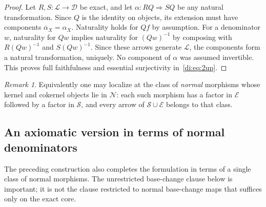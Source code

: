 \documentclass[11pt,reqno,a4paper]{amsart}
\theoremstyle{definition}
\theoremstyle{remark}
\newtheorem{remark}[theorem]{Remark}
\newcommand{\D}{\mathcal{D}}
\newcommand{\N}{\mathcal{N}}
\newcommand{\0}{\mathbf{0}}
\renewcommand{\1}{\mathbf{1}}
\newcommand{\Sden}{\mathcal S}
\newcommand{\Eden}{\mathcal E}
\newcommand{\Loc}{\mathcal L}
\begin{document}
\begin{proof}
Let $R,S:\Loc\to\D$ be exact, and let $\alpha:RQ\Rightarrow SQ$ be any natural transformation. Since $Q$ is the identity on objects, its extension must have components $\overline\alpha_X=\alpha_X$. Naturality holds for $Qf$ by assumption. For a denominator $w$, naturality for $Qw$ implies naturality for $(Qw)^{-1}$ by composing with $R(Qw)^{-1}$ and $S(Qw)^{-1}$. Since these arrows generate $\Loc$, the components form a natural transformation, uniquely. No component of $\alpha$ was assumed invertible. This proves full faithfulness and essential surjectivity in~\eqref{di:eq:2up}.
\end{proof}

\begin{remark}
Equivalently one may localize at the class of \emph{normal} morphisms whose kernel and cokernel objects lie in $\N$: each such morphism has a factor in $\Eden$ followed by a factor in $\Sden$, and every arrow of $\Sden\cup\Eden$ belongs to that class.
\end{remark}

\subsection{An axiomatic version in terms of normal denominators}\label{subsec:di-exact-denominators}

The preceding construction also completes the formulation in terms
of a single class of normal morphisms. The unrestricted base-change
clause below is important; it is not the clause restricted to normal
base-change maps that suffices only on the exact core.
\end{document}
